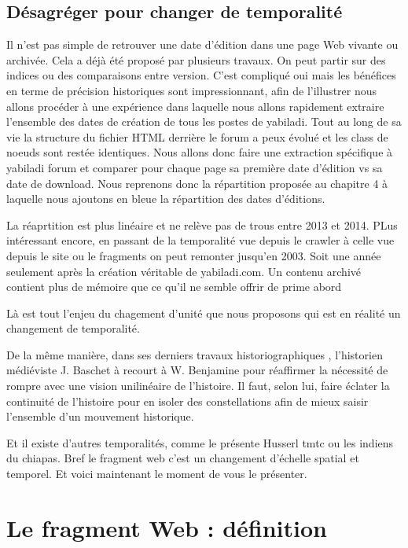 \documentclass[symmetric,justified,marginals=raggedouter]{tufte-book}
\begin{document}
\subsection{Désagréger pour changer de temporalité}

Il n'est pas simple de retrouver une date d'édition dans une page Web vivante ou archivée. Cela a déjà été proposé par plusieurs travaux. On peut partir sur des indices ou des comparaisons entre version. C'est compliqué oui mais les bénéfices en terme de précision historiques sont impressionnant, afin de l'illustrer nous allons procéder à une expérience dans laquelle nous allons rapidement extraire l'ensemble des dates de création de tous les postes de yabiladi. Tout au long de sa vie la structure du fichier HTML derrière le forum a peux évolué et les class de noeuds sont restée identiques. Nous allons donc faire une extraction spécifique à yabiladi forum et comparer pour chaque page sa première date d'édition vs sa date de download. Nous reprenons donc la répartition proposée au chapitre 4 à laquelle nous ajoutons en bleue la répartition des dates d'éditions.

La réaprtition est plus linéaire et ne relève pas de trous entre 2013 et 2014. PLus intéressant encore, en passant de la temporalité vue depuis le crawler à celle vue depuis le site ou le fragments on peut remonter jusqu'en 2003. Soit une année seulement après la création véritable de yabiladi.com. Un contenu archivé contient plus de mémoire que ce qu'il ne semble offrir de prime abord

Là est tout l'enjeu du chagement d'unité que nous proposons qui est en réalité un changement de temporalité.

De la même manière, dans ses derniers travaux historiographiques \citep{baschet_defaire_2018}, l'historien médiéviste J. Baschet à recourt à W. Benjamine pour réaffirmer la nécessité de rompre avec une vision unilinéaire de l'histoire. Il faut, selon lui, faire éclater la continuité de l'histoire pour en isoler des constellations afin de mieux saisir l'ensemble d'un mouvement historique. 

Et il existe d'autres temporalités, comme le présente Husserl tmtc ou les indiens du chiapas. Bref le fragment web c'est un changement d'échelle spatial et temporel. Et voici maintenant le moment de vous le présenter.

\section{Le fragment Web : définition}
\end{document}
